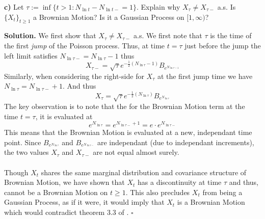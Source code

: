 \documentclass{article}
\begin{document}
\begin{tcolorbox}
[colframe=black,colback=gray!5,boxrule=0.5pt]
\textbf{c)} Let $\tau := \inf\{t>1 : N_{\ln t} - N_{\ln t-} = 1\}$. Explain why $X_{\tau}\neq X_{\tau-}$ a.s. Is $\{X_t\}_{t\geq 1}$ a Brownian Motion? Is it a Gaussian Process on $[1, \infty)$? 
\end{tcolorbox}
\textbf{Solution.} We first show that $X_\tau \neq X_{\tau -}$ a.s. We first note that $\tau$ is the time of the first \textit{jump} of the Poisson process. Thus, at time $t=\tau$ just before the jump the left limit satisfies $N_{\ln\tau-} = N_{\ln \tau} -1$ thus 
$$X_{\tau -} = \sqrt{\tau} e^{-\frac{1}{2}(N_{\ln\tau}-1)}B_{e^{N_{\ln\tau -1}}}$$
Similarly, when considering the right-side for $X_{\tau}$ at the first jump time we have $N_{\ln \tau} = N_{\ln \tau-}+1$. And thus 
$$X_{\tau} = \sqrt{\tau} e^{-\frac{1}{2}(N_{\ln\tau})}B_{e^{N_{\ln\tau}}}$$
The key observation is to note that the for the Brownian Motion term at the time $t=\tau$, it is evaluated at
$$e^{N_{\ln\tau}} = e^{N_{\ln\tau-}+1} = e\cdot e^{N_{\ln\tau-}}$$
This means that the Brownian Motion is evaluated at a new, independant time point. Since $B_{e^{N_{\ln\tau}}}$ and $B_{e^{N_{\ln \tau-}}}$ are independant (due to independant increments), the two values $X_{\tau}$ and $X_{\tau-}$ are not equal almost surely. \\
\\
Though $X_t$ shares the same marginal distribution and covariance structure of Brownian Motion, we have shown that $X_t$ has a discontinuity at time $\tau$ and thus, cannot be a Brownian Motion on $t\geq 1$. This also precludes $X_t$ from being a Gaussian Process, as if it were, it would imply that $X_t$ is a Brownian Motion which would contradict theorem 3.3 of \cite{Fima}. $\square$


\newpage
\end{document}
